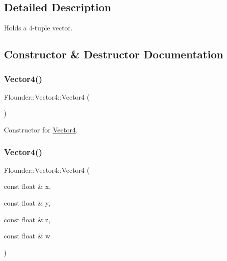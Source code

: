 \subsection{Detailed Description}
Holds a 4-\/tuple vector. 



\subsection{Constructor \& Destructor Documentation}
\mbox{\label{class_flounder_1_1_vector4_a104680995117ea8aa91fe36eb1960a34}} 
\subsubsection{\texorpdfstring{Vector4()}{Vector4()}\hspace{0.1cm}{\footnotesize\ttfamily [1/4]}}
{\footnotesize\ttfamily Flounder\+::\+Vector4\+::\+Vector4 (\begin{DoxyParamCaption}{ }\end{DoxyParamCaption})}



Constructor for \hyperlink{class_flounder_1_1_vector4}{Vector4}. 

\mbox{\label{class_flounder_1_1_vector4_a498939229349ac6e1e4a8646988e25b8}} 
\subsubsection{\texorpdfstring{Vector4()}{Vector4()}\hspace{0.1cm}{\footnotesize\ttfamily [2/4]}}
{\footnotesize\ttfamily Flounder\+::\+Vector4\+::\+Vector4 (\begin{DoxyParamCaption}\item[{const float \&}]{x,  }\item[{const float \&}]{y,  }\item[{const float \&}]{z,  }\item[{const float \&}]{w }\end{DoxyParamCaption})}



